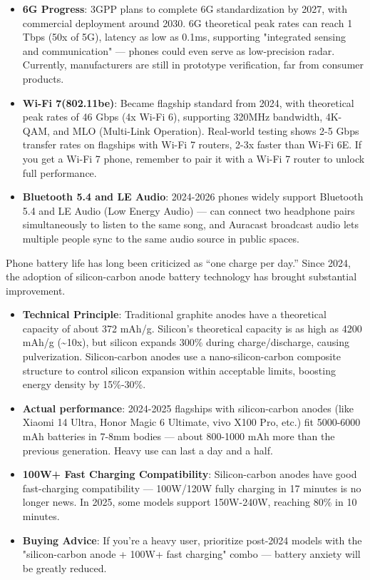 \begin{itemize}
  \item \textbf{6G Progress}: 3GPP plans to complete 6G standardization by 2027, with commercial deployment around 2030. 6G theoretical peak rates can reach 1 Tbps (50x of 5G), latency as low as 0.1ms, supporting "integrated sensing and communication" — phones could even serve as low-precision radar. Currently, manufacturers are still in prototype verification, far from consumer products.
  \item \textbf{Wi-Fi 7(802.11be)}: Became flagship standard from 2024, with theoretical peak rates of 46 Gbps (4x Wi-Fi 6), supporting 320MHz bandwidth, 4K-QAM, and MLO (Multi-Link Operation). Real-world testing shows 2-5 Gbps transfer rates on flagships with Wi-Fi 7 routers, 2-3x faster than Wi-Fi 6E. If you get a Wi-Fi 7 phone, remember to pair it with a Wi-Fi 7 router to unlock full performance.
  \item \textbf{Bluetooth 5.4 and LE Audio}: 2024-2026 phones widely support Bluetooth 5.4 and LE Audio (Low Energy Audio) — can connect two headphone pairs simultaneously to listen to the same song, and Auracast broadcast audio lets multiple people sync to the same audio source in public spaces.
\end{itemize}


Phone battery life has long been criticized as “one charge per day.” Since 2024, the adoption of silicon-carbon anode battery technology has brought substantial improvement.

\begin{itemize}
  \item \textbf{Technical Principle}: Traditional graphite anodes have a theoretical capacity of about 372 mAh/g. Silicon's theoretical capacity is as high as 4200 mAh/g (\textasciitilde{}10x), but silicon expands 300\% during charge/discharge, causing pulverization. Silicon-carbon anodes use a nano-silicon-carbon composite structure to control silicon expansion within acceptable limits, boosting energy density by 15\%-30\%.
  \item \textbf{Actual performance}: 2024-2025 flagships with silicon-carbon anodes (like Xiaomi 14 Ultra, Honor Magic 6 Ultimate, vivo X100 Pro, etc.) fit 5000-6000 mAh batteries in 7-8mm bodies — about 800-1000 mAh more than the previous generation. Heavy use can last a day and a half.
  \item \textbf{100W+ Fast Charging Compatibility}: Silicon-carbon anodes have good fast-charging compatibility — 100W/120W fully charging in 17 minutes is no longer news. In 2025, some models support 150W-240W, reaching 80\% in 10 minutes.
  \item \textbf{Buying Advice}: If you're a heavy user, prioritize post-2024 models with the "silicon-carbon anode + 100W+ fast charging" combo — battery anxiety will be greatly reduced.
\end{itemize}

